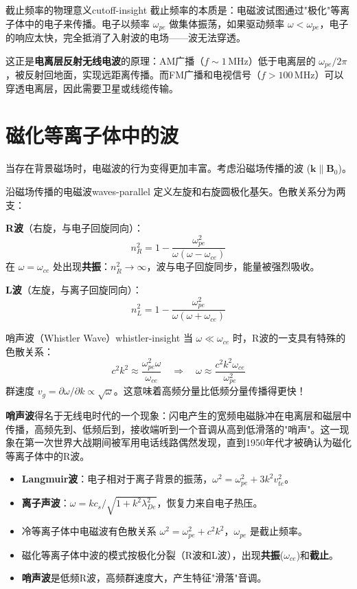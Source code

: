 \documentclass[12pt,a4paper,openany,oneside]{book}
\newcommand{\vect}[1]{\bm{#1}}
\newcommand{\difficulty}[1]{\marginnote{\textcolor{red}{\textbf{[#1]}}}}
\begin{document}
\begin{insight}{截止频率的物理意义}{cutoff-insight}
截止频率的本质是：电磁波试图通过"极化"等离子体中的电子来传播。电子以频率 $\omega_{pe}$ 做集体振荡，如果驱动频率 $\omega < \omega_{pe}$，电子的响应太快，完全抵消了入射波的电场——波无法穿透。

这正是\textbf{电离层反射无线电波}的原理：AM广播（$f\sim 1\,\mathrm{MHz}$）低于电离层的 $\omega_{pe}/2\pi$，被反射回地面，实现远距离传播。而FM广播和电视信号（$f>100\,\mathrm{MHz}$）可以穿透电离层，因此需要卫星或线缆传输。
\end{insight}

\section{磁化等离子体中的波}\difficulty{提高}

当存在背景磁场时，电磁波的行为变得更加丰富。考虑沿磁场传播的波 ($\vect{k}\parallel\vect{B}_0$)。

\begin{theorem}{沿磁场传播的电磁波}{waves-parallel}
定义左旋和右旋圆极化基矢。色散关系分为两支：

\textbf{R波}（右旋，与电子回旋同向）：
\[
n_R^2 = 1 - \frac{\omega_{pe}^2}{\omega(\omega - \omega_{ce})}
\]
在 $\omega = \omega_{ce}$ 处出现\textbf{共振}：$n_R^2 \to \infty$，波与电子回旋同步，能量被强烈吸收。

\textbf{L波}（左旋，与离子回旋同向）：
\[
n_L^2 = 1 - \frac{\omega_{pe}^2}{\omega(\omega + \omega_{ce})}
\]
\end{theorem}

\begin{insight}{哨声波（Whistler Wave）}{whistler-insight}
当 $\omega \ll \omega_{ce}$ 时，R波的一支具有特殊的色散关系：
\[
c^2 k^2 \approx \frac{\omega_{pe}^2 \omega}{\omega_{ce}}
\quad\Rightarrow\quad
\omega \approx \frac{c^2 k^2 \omega_{ce}}{\omega_{pe}^2}
\]
群速度 $v_g = \partial\omega/\partial k \propto \sqrt{\omega}$。这意味着高频分量比低频分量传播得更快！

\textbf{哨声波}得名于无线电时代的一个现象：闪电产生的宽频电磁脉冲在电离层和磁层中传播，高频先到、低频后到，接收端听到一个音调从高到低滑落的"哨声"。这一现象在第一次世界大战期间被军用电话线路偶然发现，直到1950年代才被确认为磁化等离子体中的R波。
\end{insight}

\begin{chapterreview}
\begin{itemize}
\item \textbf{Langmuir波}：电子相对于离子背景的振荡，$\omega^2 = \omega_{pe}^2 + 3k^2v_{te}^2$。
\item \textbf{离子声波}：$\omega = kc_s/\sqrt{1+k^2\lambda_{De}^2}$，恢复力来自电子热压。
\item 冷等离子体中电磁波有色散关系 $\omega^2 = \omega_{pe}^2 + c^2k^2$，$\omega_{pe}$ 是截止频率。
\item 磁化等离子体中波的模式按极化分裂（R波和L波），出现\textbf{共振}($\omega_{ce}$)和\textbf{截止}。
\item \textbf{哨声波}是低频R波，高频群速度大，产生特征"滑落"音调。
\end{itemize}
\end{chapterreview}
\end{document}
